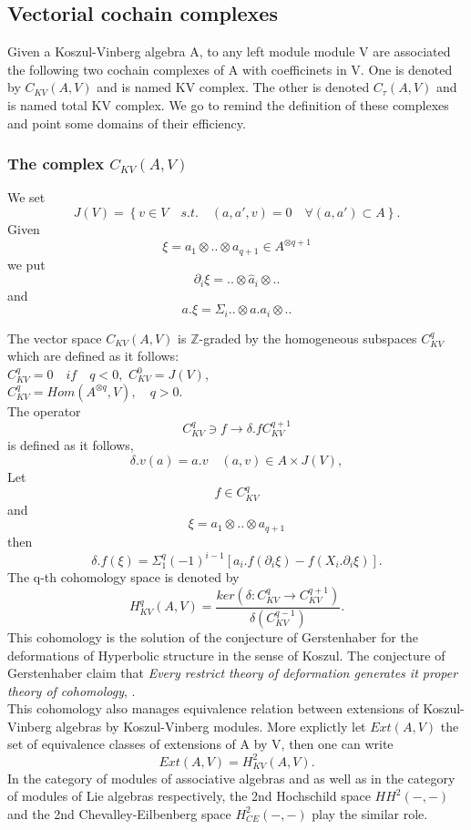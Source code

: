 \subsection{Vectorial cochain complexes }
Given a Koszul-Vinberg algebra A, to any left module module V are associated the following two cochain complexes of A with coefficinets in V. One is denoted by $C_{KV}(A,V)$ and is named KV complex. The other is denoted $C_\tau(A,V)$ and is named total KV complex. We go to remind the definition of these complexes and point some domains of their efficiency.\\
\subsubsection{The complex $C_{KV}(A,V)$}
We set 
$$J(V) =\left\{v \in V\quad s.t.\quad (a,a',v) = 0 \quad 
\forall (a,a')\subset A\right\}.$$
Given 
$$\xi = a_1\otimes..\otimes a_{q+1} \in A^{\otimes q+1}$$
we put
$$\partial_i\xi = ..\otimes \hat{a}_i \otimes..$$
and 
$$a.\xi = \Sigma_i ..\otimes a.a_i\otimes..$$

The vector space $C_{KV}(A,V)$ is $\mathbb{Z}$-graded by the homogeneous subspaces $C^q_{KV}$ which are defined as it follows:\\

$C^q_{KV} = 0 \quad if \quad q < 0, $
$C^0_{KV} = J(V)$,\\
$C^q_{KV} = Hom(A^{\otimes q},V),\quad q > 0.$\\
The operator 
$$C^q_{KV}\ni f \rightarrow \delta.f C^{q+1}_{KV}$$
is defined as it follows,
$$\delta.v(a) = a.v \quad (a,v) \in A \times J(V),$$
Let $$f \in C^q_{KV}$$
and 
$$\xi = a_1\otimes.. \otimes a_{q+1}$$
then
$$\delta.f (\xi) = \Sigma^q_1 (-1)^{i-1}[a_i.f(\partial_i\xi) - f(X_i.\partial_i\xi)].$$
The q-th cohomology space is denoted by
$$H^q_{KV}(A,V) = \frac{ker(\delta: C^q_{KV}\rightarrow C^{q+1}_{KV})}{\delta (C^{q-1}_{KV})}.$$
This cohomology is the solution of the conjecture of Gerstenhaber for the deformations of Hyperbolic structure in the sense of Koszul. The conjecture of Gerstenhaber claim that \textit{Every restrict theory of deformation generates it proper theory of cohomology}, \cite{Gerstenhaber1964}.\\
This cohomology also manages equivalence relation between extensions of Koszul-Vinberg algebras by Koszul-Vinberg modules. More explictly let $Ext(A,V)$ the set of equivalence classes of extensions of A by V, then one can write 
$$Ext(A,V) = H^2_{KV}(A,V).$$
In the category of modules of associative algebras and as well as in the category of modules of Lie algebras respectively, the 2nd Hochschild space $HH^2(-,-)$ and the 2nd Chevalley-Eilbenberg space $H^2_{CE}(-,-)$ play the similar role. 
